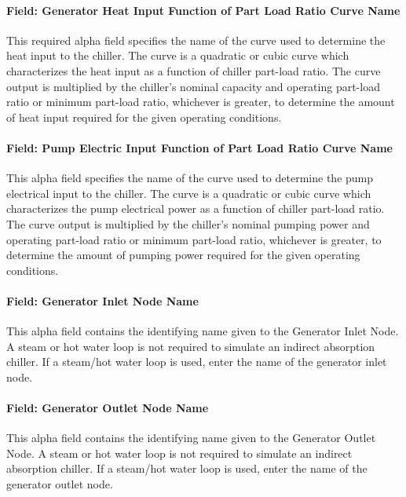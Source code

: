 \paragraph{Field: Generator Heat Input Function of Part Load Ratio Curve Name}\label{field-generator-heat-input-function-of-part-load-ratio-curve-name}

This required alpha field specifies the name of the curve used to determine the heat input to the chiller. The curve is a quadratic or cubic curve which characterizes the heat input as a function of chiller part-load ratio. The curve output is multiplied by the chiller's nominal capacity and operating part-load ratio or minimum part-load ratio, whichever is greater, to determine the amount of heat input required for the given operating conditions.

\paragraph{Field: Pump Electric Input Function of Part Load Ratio Curve Name}\label{field-pump-electric-input-function-of-part-load-ratio-curve-name}

This alpha field specifies the name of the curve used to determine the pump electrical input to the chiller. The curve is a quadratic or cubic curve which characterizes the pump electrical power as a function of chiller part-load ratio. The curve output is multiplied by the chiller's nominal pumping power and operating part-load ratio or minimum part-load ratio, whichever is greater, to determine the amount of pumping power required for the given operating conditions.

\paragraph{Field: Generator Inlet Node Name}\label{field-generator-inlet-node-name-1}

This alpha field contains the identifying name given to the Generator Inlet Node. A steam or hot water loop is not required to simulate an indirect absorption chiller. If a steam/hot water loop is used, enter the name of the generator inlet node.

\paragraph{Field: Generator Outlet Node Name}\label{field-generator-outlet-node-name-1}

This alpha field contains the identifying name given to the Generator Outlet Node. A steam or hot water loop is not required to simulate an indirect absorption chiller. If a steam/hot water loop is used, enter the name of the generator outlet node.


